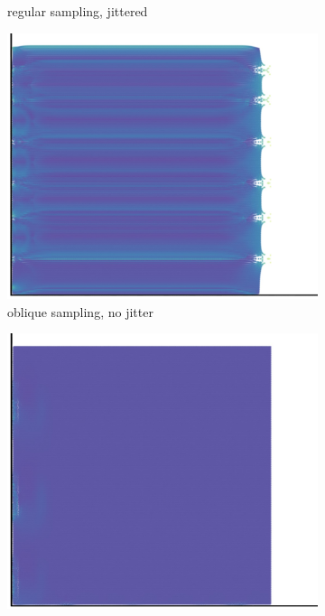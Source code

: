 \begin{figure}[H]
\begin{subfigure}[t]{0.49\textwidth}
    \caption{regular sampling, jittered}
  \end{subfigure}
  \begin{subfigure}[t]{0.49\textwidth}
    \centering
    \includegraphics*[width=\textwidth]{images/initial/chex_0_02.jpg}
    \caption{oblique sampling, no jitter}
  \end{subfigure}
  \begin{subfigure}[t]{0.49\textwidth}
    \centering
    \includegraphics*[width=\textwidth]{images/initial/chex_jit_0.02.jpg}

\end{subfigure}
\end{figure}
